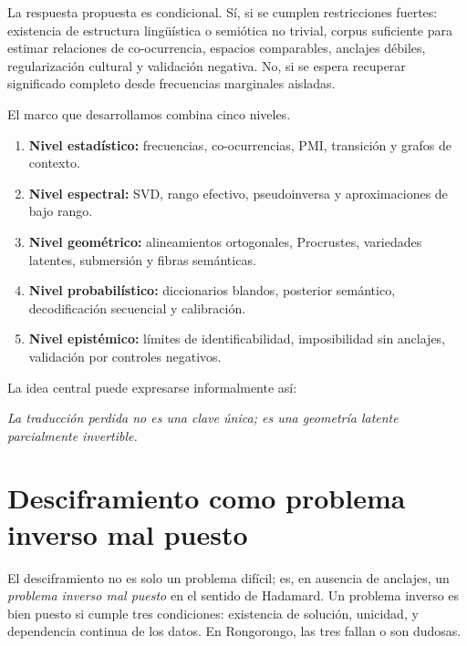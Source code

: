 \documentclass[11pt,a4paper]{article}
\newcommand{\1}{\mathbf{1}}
\numberwithin{equation}{section}
\begin{document}
La respuesta propuesta es condicional. Sí, si se cumplen restricciones fuertes: existencia de estructura lingüística o semiótica no trivial, corpus suficiente para estimar relaciones de co-ocurrencia, espacios comparables, anclajes débiles, regularización cultural y validación negativa. No, si se espera recuperar significado completo desde frecuencias marginales aisladas.

El marco que desarrollamos combina cinco niveles.

\begin{enumerate}[label=\textbf{N\arabic*.}]
    \item \textbf{Nivel estadístico:} frecuencias, co-ocurrencias, PMI, transición y grafos de contexto.
    \item \textbf{Nivel espectral:} SVD, rango efectivo, pseudoinversa y aproximaciones de bajo rango.
    \item \textbf{Nivel geométrico:} alineamientos ortogonales, Procrustes, variedades latentes, submersión y fibras semánticas.
    \item \textbf{Nivel probabilístico:} diccionarios blandos, posterior semántico, decodificación secuencial y calibración.
    \item \textbf{Nivel epistémico:} límites de identificabilidad, imposibilidad sin anclajes, validación por controles negativos.
\end{enumerate}

La idea central puede expresarse informalmente así:

\begin{center}
\emph{La traducción perdida no es una clave única; es una geometría latente parcialmente invertible.}
\end{center}

\section{Desciframiento como problema inverso mal puesto}
\label{sec:ill_posed}

El desciframiento no es solo un problema difícil; es, en ausencia de anclajes, un \emph{problema inverso mal puesto} en el sentido de Hadamard. Un problema inverso es bien puesto si cumple tres condiciones: existencia de solución, unicidad, y dependencia continua de los datos. En Rongorongo, las tres fallan o son dudosas.
\end{document}
